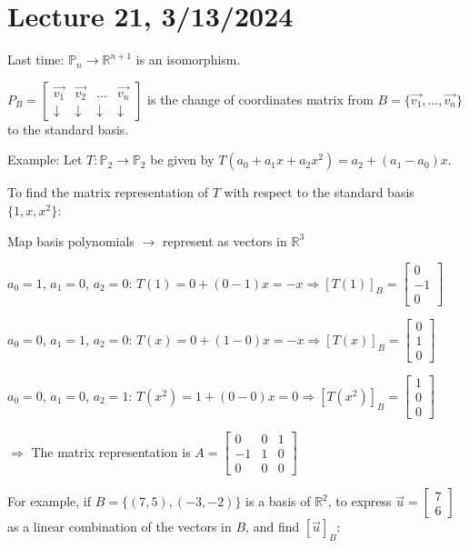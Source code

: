 \documentclass{article}
\begin{document}
\section{Lecture 21, 3/13/2024}

Last time: \(\mathbb{P}_n \rightarrow \mathbb{R}^{n+1}\) is an isomorphism. 

\(P_B = \begin{bmatrix} \vec{v_1} & \vec{v_2} & \ldots & \vec{v_n} \\ \downarrow & \downarrow & \downarrow & \downarrow \end{bmatrix}\) is the change of coordinates matrix from \(B = \{\vec{v_1}, \ldots, \vec{v_n}\}\) to the standard basis.

Example: Let \(T : \mathbb{P}_2 \rightarrow \mathbb{P}_2\) be given by \(T(a_0 + a_1x + a_2x^2) = a_2 + (a_1 - a_0)x\). 

To find the matrix representation of \(T\) with respect to the standard basis \(\{1, x, x^2\}\):

Map basis polynomials \(\rightarrow\) represent as vectors in \(\mathbb{R}^3\)

\(a_0 = 1\), \(a_1 = 0\), \(a_2 = 0\): \(T(1) = 0 + (0 - 1)x = -x \Rightarrow [T(1)]_B = \begin{bmatrix} 0 \\ -1 \\ 0 \end{bmatrix}\)

\(a_0 = 0\), \(a_1 = 1\), \(a_2 = 0\): \(T(x) = 0 + (1 - 0)x = -x \Rightarrow [T(x)]_B = \begin{bmatrix} 0 \\ 1 \\ 0 \end{bmatrix}\)

\(a_0 = 0\), \(a_1 = 0\), \(a_2 = 1\): \(T(x^2) = 1 + (0 - 0)x = 0 \Rightarrow [T(x^2)]_B = \begin{bmatrix} 1 \\ 0 \\ 0 \end{bmatrix}\)

\(\Rightarrow\) The matrix representation is \(A = \begin{bmatrix} 0 & 0 & 1 \\ -1 & 1 & 0 \\ 0 & 0 & 0 \end{bmatrix}\)

For example, if \(B = \{(7,5), (-3,-2)\}\) is a basis of \(\mathbb{R}^2\), to express \(\vec{u} = \begin{bmatrix} 7 \\ 6 \end{bmatrix}\) as a linear combination of the vectors in \(B\), and find \([\vec{u}]_B\):
\end{document}
